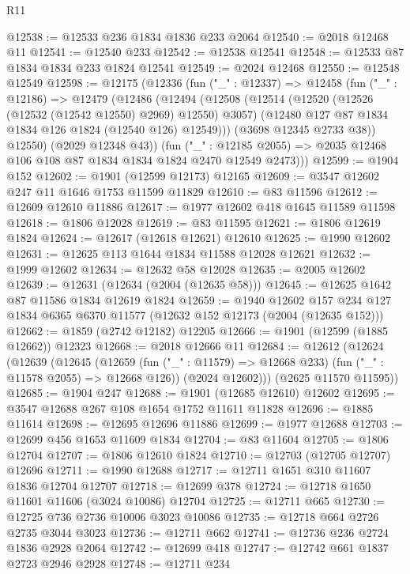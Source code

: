 \begin{lexlean}{R11}
\begin{coremodule}
@12538 := @12533 @236 @1834 @1836 @233 @2064
@12540 := @2018 @12468 @11
@12541 := @12540 @233
@12542 := @12538 @12541
@12548 := @12533 @87 @1834 @1834 @233 @1824 @12541
@12549 := @2024 @12468
@12550 := @12548 @12549
@12598 := @12175
    (@12336
      (fun ("_" : @12337) =>
      @12458
        (fun ("_" : @12186) =>
        @12479
          (@12486
            (@12494
              (@12508
                (@12514
                  (@12520 (@12526 (@12532 (@12542 @12550) @2969) @12550) @3057)
                  (@12480 @127 @87 @1834 @1834 @126 @1824 (@12540 @126) @12549)))
              (@3698 @12345 @2733 @38))
            @12550)
          (@2029 @12348 @43))
        (fun ("_" : @12185 @2055) =>
        @2035 @12468 @106 @108 @87 @1834 @1834 @1824 @2470 @12549 @2473)))
@12599 := @1904 @152
@12602 := @1901 (@12599 @12173) @12165
@12609 := @3547 @12602 @247 @11 @1646 @1753 @11599 @11829
@12610 := @83 @11596
@12612 := @12609 @12610 @11886
@12617 := @1977 @12602 @418 @1645 @11589 @11598
@12618 := @1806 @12028
@12619 := @83 @11595
@12621 := @1806 @12619 @1824
@12624 := @12617 (@12618 @12621) @12610
@12625 := @1990 @12602
@12631 := @12625 @113 @1644 @1834 @11588 @12028 @12621
@12632 := @1999 @12602
@12634 := @12632 @58 @12028
@12635 := @2005 @12602
@12639 := @12631 (@12634 (@2004 (@12635 @58)))
@12645 := @12625 @1642 @87 @11586 @1834 @12619 @1824
@12659 := @1940
    @12602
    @157
    @234
    @127
    @1834
    @6365
    @6370
    @11577
    (@12632 @152 @12173 (@2004 (@12635 @152)))
@12662 := @1859 (@2742 @12182) @12205
@12666 := @1901 (@12599 (@1885 @12662)) @12323
@12668 := @2018 @12666 @11
@12684 := @12612
    (@12624
      (@12639
        (@12645
          (@12659 (fun ("_" : @11579) => @12668 @233) (fun ("_" : @11578 @2055) => @12668 @126))
          (@2024 @12602)))
      (@2625 @11570 @11595))
@12685 := @1904 @247
@12688 := @1901 (@12685 @12610) @12602
@12695 := @3547 @12688 @267 @108 @1654 @1752 @11611 @11828
@12696 := @1885 @11614
@12698 := @12695 @12696 @11886
@12699 := @1977 @12688
@12703 := @12699 @456 @1653 @11609 @1834
@12704 := @83 @11604
@12705 := @1806 @12704
@12707 := @1806 @12610 @1824
@12710 := @12703 (@12705 @12707) @12696
@12711 := @1990 @12688
@12717 := @12711 @1651 @310 @11607 @1836 @12704 @12707
@12718 := @12699 @378
@12724 := @12718 @1650 @11601 @11606 (@3024 @10086) @12704
@12725 := @12711 @665
@12730 := @12725 @736 @2736 @10006 @3023 @10086
@12735 := @12718 @664 @2726 @2735 @3044 @3023
@12736 := @12711 @662
@12741 := @12736 @236 @2724 @1836 @2928 @2064
@12742 := @12699 @418
@12747 := @12742 @661 @1837 @2723 @2946 @2928
@12748 := @12711 @234

\end{coremodule}
\end{lexlean}
